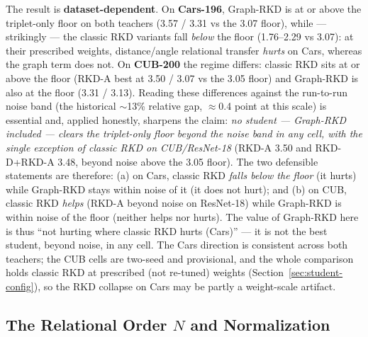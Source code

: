 \documentclass[11pt,letterpaper]{article}
\begin{document}
The result is \textbf{dataset-dependent}. On \textbf{Cars-196}, Graph-RKD is at or above
the triplet-only floor on both teachers (3.57 / 3.31 vs the 3.07 floor), while ---
strikingly --- the classic RKD variants fall \emph{below} the floor (1.76--2.29 vs 3.07):
at their prescribed weights, distance/angle relational transfer \emph{hurts} on Cars,
whereas the graph term does not. On \textbf{CUB-200} the regime differs: classic RKD sits
at or above the floor (RKD-A best at 3.50 / 3.07 vs the 3.05 floor) and Graph-RKD is also
at the floor (3.31 / 3.13). Reading these differences against the run-to-run noise band
(the historical $\sim$13\% relative gap, $\approx$0.4 point at this scale) is essential
and, applied honestly, sharpens the claim: \emph{no student --- Graph-RKD included ---
clears the triplet-only floor beyond the noise band in any cell, with the single
exception of classic RKD on CUB/ResNet-18} (RKD-A 3.50 and RKD-D+RKD-A 3.48, beyond
noise above the 3.05 floor). The two defensible statements are therefore: (a) on Cars,
classic RKD \emph{falls below the floor} (it hurts) while Graph-RKD stays within noise of
it (it does not hurt); and (b) on CUB, classic RKD \emph{helps} (RKD-A beyond noise on
ResNet-18) while Graph-RKD is within noise of the floor (neither helps nor hurts). The
value of Graph-RKD here is thus ``not hurting where classic RKD hurts (Cars)'' --- it is
not the best student, beyond noise, in any cell. The Cars direction is consistent across
both teachers; the CUB cells are two-seed and provisional, and the whole comparison holds
classic RKD at prescribed (not re-tuned) weights (Section~\ref{sec:student-config}), so
the RKD collapse on Cars may be partly a weight-scale artifact.

\subsection{The Relational Order \texorpdfstring{$N$}{N} and Normalization}
\label{sec:results-order}
\end{document}
